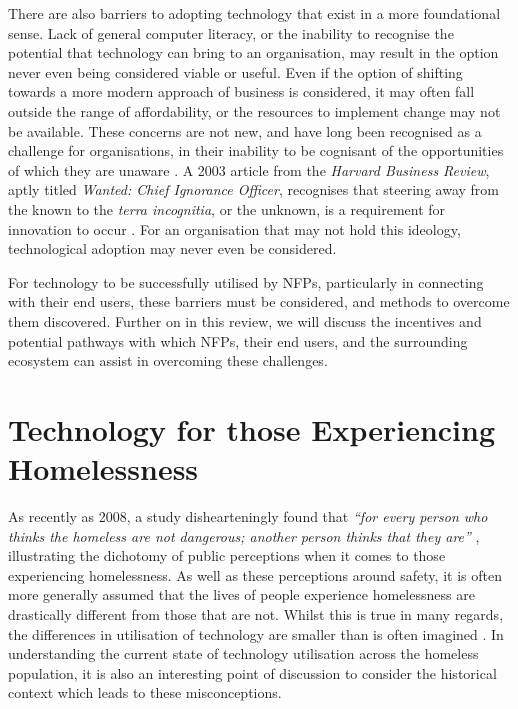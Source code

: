 There are also barriers to adopting technology that exist in a more foundational sense. Lack of general computer literacy, or the inability to recognise the potential that technology can bring to an organisation, may result in the option never even being considered viable or useful. Even if the option of shifting towards a more modern approach of business is considered, it may often fall outside the range of affordability, or the resources to implement change may not be available. These concerns are not new, and have long been recognised as a challenge for organisations, in their inability to be cognisant of the opportunities of which they are unaware \cite{benjamin1983information}. A 2003 article from the \emph{Harvard Business Review}, aptly titled \emph{Wanted: Chief Ignorance Officer}, recognises that steering away from the known to the \emph{terra incognitia}, or the unknown, is a requirement for innovation to occur \cite{gray2003wanted}. For an organisation that may not hold this ideology, technological adoption may never even be considered.

For technology to be successfully utilised by NFPs, particularly in connecting with their end users, these barriers must be considered, and methods to overcome them discovered. Further on in this review, we will discuss the incentives and potential pathways with which NFPs, their end users, and the surrounding ecosystem can assist in overcoming these challenges.

\section{Technology for those Experiencing Homelessness}

As recently as 2008, a study dishearteningly found that \emph{“for every person who thinks the homeless are not dangerous; another person thinks that they are”} \cite{donley2008perception}, illustrating the dichotomy of public perceptions when it comes to those experiencing homelessness. As well as these perceptions around safety, it is often more generally assumed that the lives of people experience homelessness are drastically different from those that are not. Whilst this is true in many regards, the differences in utilisation of technology are smaller than is often imagined \cite{le2008designs} \cite{pollio2013technology} \cite{rhoades2017no}. In understanding the current state of technology utilisation across the homeless population, it is also an interesting point of discussion to consider the historical context which leads to these misconceptions.

